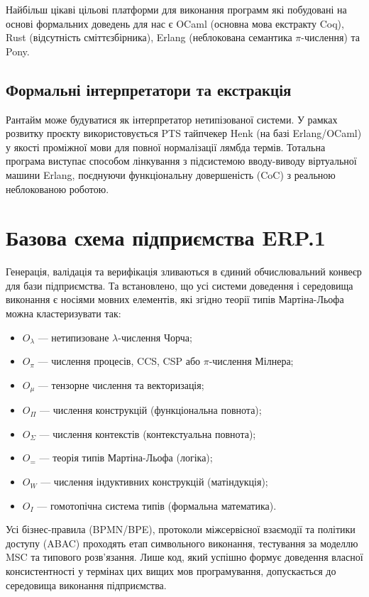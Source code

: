 Найбільш цікаві цільові платформи для виконання программ які побудовані на основі формальних доведень для нас є OCaml (основна мова екстракту Coq), Rust (відсутність сміттєзбірника), Erlang (неблокована семантика $\pi$-числення) та Pony.

\subsection{Формальні інтерпретатори та екстракція}
Рантайм може будуватися як інтерпретатор нетипізованої системи. У рамках розвитку проєкту використовується PTS тайпчекер Henk (на базі Erlang/OCaml) у якості проміжної мови для повної нормалізації лямбда термів. Тотальна програма виступає способом лінкування з підсистемою вводу-виводу віртуальної машини Erlang, поєднуючи функціональну довершеність (CoC) з реальною неблокованою роботою.

\section{Базова схема підприємства ERP.1}

Генерація, валідація та верифікація зливаються в єдиний обчислювальний конвеєр для бази підприємства. Та встановлено, що усі системи доведення і середовища виконання є носіями мовних елементів, які згідно теорії типів Мартіна-Льофа можна кластеризувати так:
\begin{itemize}
    \item $O_\lambda$ --- нетипизоване $\lambda$-числення Чорча;
    \item $O_\pi$ --- числення процесів, CCS, CSP або $\pi$-числення Мілнера;
    \item $O_\mu$ --- тензорне числення та векторизація;
    \item $O_\Pi$ --- числення конструкцій (функціональна повнота);
    \item $O_\Sigma$ --- числення контекстів (контекстуальна повнота);
    \item $O_=$ --- теорія типів Мартіна-Льофа (логіка);
    \item $O_W$ --- числення індуктивних конструкцій (матіндукція);
    \item $O_I$ --- гомотопічна система типів (формальна математика).
\end{itemize}

Усі бізнес-правила (BPMN/BPE), протоколи міжсервісної взаємодії та політики доступу (ABAC) проходять етап символьного виконання, тестування за моделлю MSC та типового розв'язання. Лише код, який успішно формує доведення власної консистентності у термінах цих вищих мов програмування, допускається до середовища виконання підприємства.
